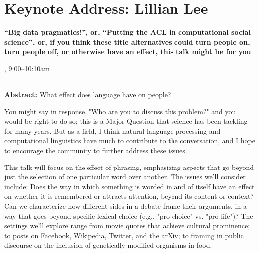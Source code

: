 \section{Keynote Address: Lillian Lee}

\begin{center}
\begin{Large}
{\bfseries\Large ``Big data pragmatics!'', or, ``Putting the ACL in computational social science'', or, if you think these title alternatives could turn people on, turn people off, or otherwise have an effect, this talk might be for you}\vspace{1em}\par
\end{Large}


\daydateyear, 9:00--10:10am \vspace{1em}\\
\PlenaryLoc \\
\vspace{1em}\par
\end{center}

\noindent
{\bfseries Abstract:} What effect does language have on people?

You might say in response, "Who are you to discuss this problem?" and
you would be right to do so; this is a Major Question that science has
been tackling for many years. But as a field, I think natural language
processing and computational linguistics have much to contribute to
the conversation, and I hope to encourage the community to further
address these issues.

This talk will focus on the effect of phrasing, emphasizing aspects
that go beyond just the selection of one particular word over
another. The issues we'll consider include: Does the way in which
something is worded in and of itself have an effect on whether it is
remembered or attracts attention, beyond its content or context? Can
we characterize how different sides in a debate frame their arguments,
in a way that goes beyond specific lexical choice (e.g., "pro-choice"
vs. "pro-life")? The settings we'll explore range from movie quotes
that achieve cultural prominence; to posts on Facebook, Wikipedia,
Twitter, and the arXiv; to framing in public discourse on the
inclusion of genetically-modified organisms in food.

